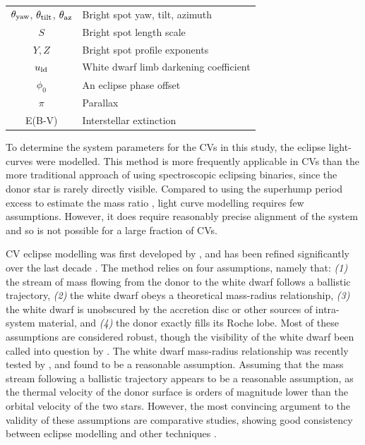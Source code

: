\begin{table}
\begin{tabular}{cl}
        $\theta_{\rm yaw}$, $\theta_{\rm tilt}$, $\theta_{\rm az}$      & Bright spot yaw, tilt, azimuth                          \\
        $S$                                                             & Bright spot length scale                                \\
        $Y, Z$                                                          & Bright spot profile exponents                           \\
        $u_{\rm ld}$                                                    & White dwarf limb darkening coefficient                  \\
        $\phi_0$                                                        & An eclipse phase offset                                 \\
        $\pi$                                                           & Parallax                                                \\
        E(B-V)                                                          & Interstellar extinction   \\

        \hline
    \end{tabular}
\end{table}

To determine the system parameters for the CVs in this study, the eclipse light-curves were modelled. This method is more frequently applicable in CVs than the more traditional approach of using spectroscopic eclipsing binaries, since the donor star is rarely directly visible. Compared to using the superhump period excess to estimate the mass ratio \citep{patterson2005, knigge2006}, light curve modelling requires few assumptions. However, it does require reasonably precise alignment of the system and so is not possible for a large fraction of CVs.

CV eclipse modelling was first developed by \citet{wood1986}, and has been refined significantly over the last decade \citep{Savoury2011, littlefair2014, mcallister2017, McAllister2019}. The method relies on four assumptions, namely that: \textit{(1)} the stream of mass flowing from the donor to the white dwarf follows a ballistic trajectory, \textit{(2)} the white dwarf obeys a theoretical mass-radius relationship, \textit{(3)} the white dwarf is unobscured by the accretion disc or other sources of intra-system material, and \textit{(4)} the donor exactly fills its Roche lobe.
Most of these assumptions are considered robust, though the visibility of the white dwarf been called into question by \citet{Spark2015}.
The white dwarf mass-radius relationship was recently tested by \citet{parsons2017}, and found to be a reasonable assumption.
Assuming that the mass stream following a ballistic trajectory appears to be a reasonable assumption, as the thermal velocity of the donor surface is orders of magnitude lower than the orbital velocity of the two stars.
However, the most convincing argument to the validity of these assumptions are comparative studies, showing good consistency between eclipse modelling and other techniques \citep{tulloch2009,copperwheat2012,savoury2012,sion2022}.


